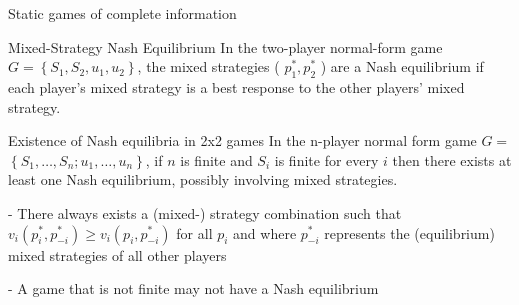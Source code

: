 \begin{titleboxchi}{Static games of complete information}
    \begin{definition}{Mixed-Strategy Nash Equilibrium}
        In the two-player normal-form game $G=\left\{S_{1}, S_{2}, u_{1}, u_{2}\right\}$, the mixed strategies (
        $p_{1}^{*}, p_{2}^{*}$
        ) are a Nash equilibrium if each player's mixed strategy is a best response to the other players' mixed
        strategy.
    \end{definition}
    
    \begin{proposition}{Existence of Nash equilibria in 2x2 games}
        In the n-player normal form game $G=$ $\left\{S_{1}, \ldots, S_{n} ; u_{1}, \ldots, u_{n}\right\}$, if $n$
        is finite and $S_{i}$ is finite for every $i$
        then there exists at least one Nash equilibrium, possibly involving mixed strategies.
        
        
        - There always exists a (mixed-) strategy combination such that
        $v_{i}\left(p_{i}^{*}, p_{-i}^{*}\right) \geq v_{i}\left(p_{i}, p_{-i}^{*}\right)$ for all $p_{i}$ and where
        $p_{-i}^{*}$ represents the (equilibrium) mixed strategies of all other players
        
        - A game that is not finite may not have a Nash equilibrium
    
    \end{proposition}

\end{titleboxchi}

